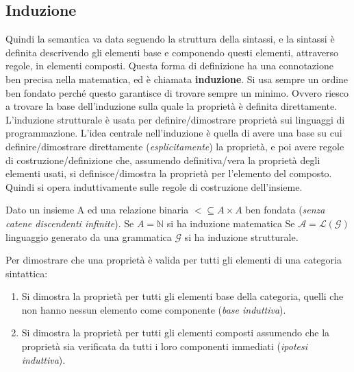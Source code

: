 \documentclass[oneside,a4paper,11pt]{book}
\theoremstyle{italicstyle}
\theoremstyle{normStyle}
\begin{document}
\subsection{Induzione}
Quindi la semantica va data seguendo la struttura della sintassi,
e la sintassi è definita descrivendo gli elementi 
base e componendo questi elementi, attraverso regole,
in elementi composti. Questa forma di definizione ha una
connotazione ben precisa nella matematica, ed è chiamata \textbf{induzione}.
Si usa sempre un ordine ben fondato perché questo garantisce di trovare
sempre un minimo. Ovvero riesco a trovare la base dell’induzione sulla
quale la proprietà è definita direttamente. L'induzione strutturale è usata
per definire/dimostrare proprietà sui linguaggi di programmazione. 
L’idea centrale nell’induzione è quella di avere una base su cui definire/dimostrare
direttamente (\textit{esplicitamente}) la proprietà, e poi avere regole di 
costruzione/definizione che, assumendo definitiva/vera la proprietà degli elementi 
usati, si definisce/dimostra la proprietà per l'elemento del composto. Quindi 
si opera induttivamente sulle regole di costruzione dell'insieme.
\begin{tcolorbox}[title={Induzione matematica e strutturale}]
Dato un insieme A ed una relazione binaria
$< \subseteq A \times A$ ben fondata (\textit{senza catene discendenti infinite}).
Se $A=\mathbb{N}$ si ha induzione matematica
Se $\mathcal{A}=\mathcal{L}(\mathcal{G})$ linguaggio generato
da una grammatica $\mathcal{G}$ si ha induzione strutturale.
\end{tcolorbox}
\begin{tcolorbox}[title={Principio di induzione strutturale}]
Per dimostrare che una proprietà è valida per tutti gli elementi
di una categoria sintattica:
\begin{enumerate}
  \item Si dimostra la proprietà per tutti gli elementi base della
  categoria, quelli che non hanno nessun elemento come componente
  (\textit{base induttiva}).
  \item Si dimostra la proprietà per tutti gli elementi composti
  assumendo che la proprietà sia verificata da tutti i loro componenti
  immediati (\textit{ipotesi induttiva}).
\end{enumerate}
\end{tcolorbox}
\end{document}
